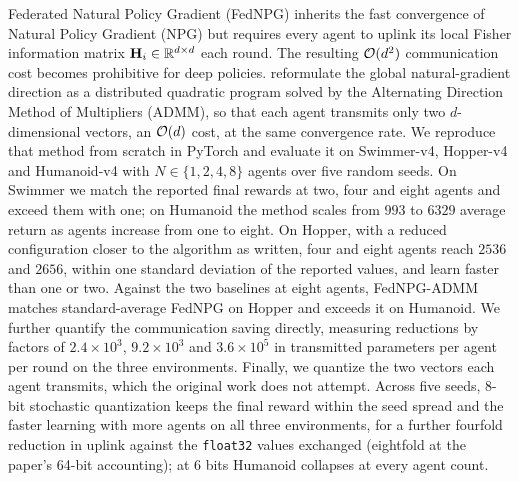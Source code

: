 Federated Natural Policy Gradient (FedNPG) inherits the fast convergence of
Natural Policy Gradient (NPG) but
requires every agent to uplink its local Fisher information matrix $\mathbf{H}_i \in
\mathbb{R}^{d\times d}$ each round. The resulting $\mathcal{O}(d^2)$ communication cost
becomes prohibitive for deep policies. \citet{lan2023fednpgadmm} reformulate
the global natural-gradient direction as a distributed quadratic program
solved by the Alternating Direction Method of Multipliers (ADMM), so that
each agent transmits only two $d$-dimensional vectors,
an $\mathcal{O}(d)$ cost, at the same convergence rate. We reproduce that method from
scratch in PyTorch and evaluate it on Swimmer-v4, Hopper-v4 and Humanoid-v4
with $N \in \{1,2,4,8\}$ agents over five random seeds. On Swimmer we match
the reported final rewards at two, four and eight agents and exceed them with
one; on Humanoid the method scales from
$993$ to $6329$ average return as agents increase from one to eight. On
Hopper, with a reduced configuration closer to the algorithm as written, four
and eight agents reach $2536$ and $2656$, within one standard deviation of the
reported values, and learn faster than one or two. Against the two baselines at eight agents, FedNPG-ADMM matches
standard-average FedNPG on Hopper and exceeds it on Humanoid. We further
quantify the communication
saving directly, measuring reductions by factors of $2.4\times 10^{3}$,
$9.2\times 10^{3}$ and $3.6\times 10^{5}$ in transmitted parameters per agent
per round on the three environments.
Finally, we quantize the two vectors each agent transmits, which the original
work does not attempt. Across five seeds, 8-bit stochastic quantization keeps
the final reward within the seed spread and the faster learning with more
agents on all three environments, for a further fourfold reduction in uplink against the
\texttt{float32} values exchanged (eightfold at the paper's 64-bit
accounting); at 6 bits Humanoid
collapses at every agent count.
